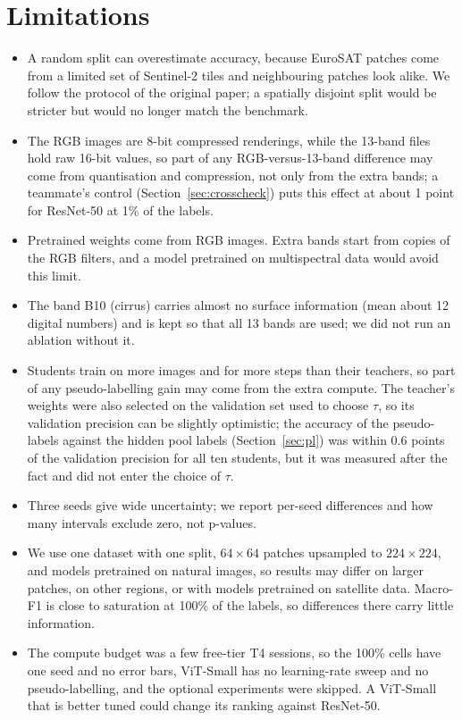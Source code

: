 \documentclass[twoside,a4paper,11pt]{article}
\begin{document}
\section{Limitations}\label{sec:limits}
\begin{itemize}
\item A random split can overestimate accuracy, because EuroSAT patches come from a limited set of Sentinel-2 tiles and neighbouring patches look alike. We follow the protocol of the original paper; a spatially disjoint split would be stricter but would no longer match the benchmark.
\item The RGB images are 8-bit compressed renderings, while the 13-band files hold raw 16-bit values, so part of any RGB-versus-13-band difference may come from quantisation and compression, not only from the extra bands; a teammate's control (Section~\ref{sec:crosscheck}) puts this effect at about 1 point for ResNet-50 at 1\% of the labels.
\item Pretrained weights come from RGB images. Extra bands start from copies of the RGB filters, and a model pretrained on multispectral data would avoid this limit.
\item The band B10 (cirrus) carries almost no surface information (mean about 12 digital numbers) and is kept so that all 13 bands are used; we did not run an ablation without it.
\item Students train on more images and for more steps than their teachers, so part of any pseudo-labelling gain may come from the extra compute. The teacher's weights were also selected on the validation set used to choose $\tau$, so its validation precision can be slightly optimistic; the accuracy of the pseudo-labels against the hidden pool labels (Section~\ref{sec:pl}) was within 0.6 points of the validation precision for all ten students, but it was measured after the fact and did not enter the choice of $\tau$.
\item Three seeds give wide uncertainty; we report per-seed differences and how many intervals exclude zero, not p-values.
\item We use one dataset with one split, $64\times64$ patches upsampled to $224\times224$, and models pretrained on natural images, so results may differ on larger patches, on other regions, or with models pretrained on satellite data. Macro-F1 is close to saturation at 100\% of the labels, so differences there carry little information.
\item The compute budget was a few free-tier T4 sessions, so the 100\% cells have one seed and no error bars, ViT-Small has no learning-rate sweep and no pseudo-labelling, and the optional experiments were skipped. A ViT-Small that is better tuned could change its ranking against ResNet-50.
\end{itemize}
\end{document}
